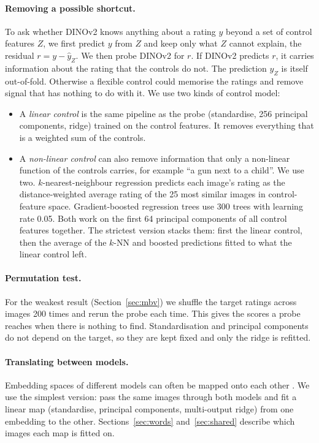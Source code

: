 \documentclass[11pt]{article}
\begin{document}
\paragraph{Removing a possible shortcut.} To ask whether DINOv2 knows anything about a rating $y$ beyond a set of control features $Z$, we first predict $y$ from $Z$ and keep only what $Z$ cannot explain, the residual $r = y - \hat{y}_Z$. We then probe DINOv2 for $r$. If DINOv2 predicts $r$, it carries information about the rating that the controls do not. The prediction $\hat{y}_Z$ is itself out-of-fold. Otherwise a flexible control could memorise the ratings and remove signal that has nothing to do with it. We use two kinds of control model:
\begin{itemize}
\item A \emph{linear control} is the same pipeline as the probe (standardise, 256 principal components, ridge) trained on the control features. It removes everything that is a weighted sum of the controls.
\item A \emph{non-linear control} can also remove information that only a non-linear function of the controls carries, for example ``a gun next to a child''. We use two. $k$-nearest-neighbour regression predicts each image's rating as the distance-weighted average rating of the 25 most similar images in control-feature space. Gradient-boosted regression trees use 300 trees with learning rate 0.05. Both work on the first 64 principal components of all control features together. The strictest version stacks them: first the linear control, then the average of the $k$-NN and boosted predictions fitted to what the linear control left.
\end{itemize}

\paragraph{Permutation test.} For the weakest result (Section~\ref{sec:mbv}) we shuffle the target ratings across images 200 times and rerun the probe each time. This gives the scores a probe reaches when there is nothing to find. Standardisation and principal components do not depend on the target, so they are kept fixed and only the ridge is refitted.

\paragraph{Translating between models.} Embedding spaces of different models can often be mapped onto each other \cite{jha2025,tasker2026}. We use the simplest version: pass the same images through both models and fit a linear map (standardise, principal components, multi-output ridge) from one embedding to the other. Sections~\ref{sec:words} and~\ref{sec:shared} describe which images each map is fitted on.
\end{document}
